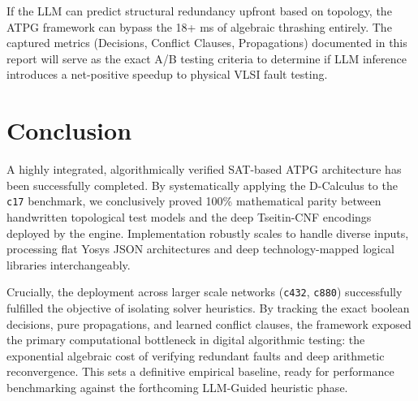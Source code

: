 \documentclass[11pt,a4paper]{article}
\begin{document}
If the LLM can predict structural redundancy upfront based on topology, the ATPG framework can bypass the 18+ ms of algebraic thrashing entirely. The captured metrics (Decisions, Conflict Clauses, Propagations) documented in this report will serve as the exact A/B testing criteria to determine if LLM inference introduces a net-positive speedup to physical VLSI fault testing.

\section{Conclusion}
A highly integrated, algorithmically verified SAT-based ATPG architecture has been successfully completed. By systematically applying the D-Calculus to the \texttt{c17} benchmark, we conclusively proved 100\% mathematical parity between handwritten topological test models and the deep Tseitin-CNF encodings deployed by the engine. Implementation robustly scales to handle diverse inputs, processing flat Yosys JSON architectures and deep technology-mapped logical libraries interchangeably.

Crucially, the deployment across larger scale networks (\texttt{c432}, \texttt{c880}) successfully fulfilled the objective of isolating solver heuristics. By tracking the exact boolean decisions, pure propagations, and learned conflict clauses, the framework exposed the primary computational bottleneck in digital algorithmic testing: the exponential algebraic cost of verifying redundant faults and deep arithmetic reconvergence. This sets a definitive empirical baseline, ready for performance benchmarking against the forthcoming LLM-Guided heuristic phase.
\end{document}
